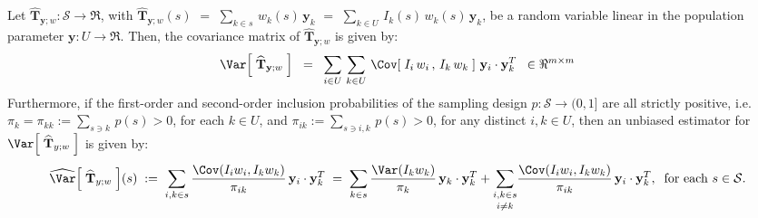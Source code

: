 \begin{proposition}
\label{proposition:generalLinear:Var}
\mbox{}
\vskip 0.2cm
\noindent
Let $\widehat{\mathbf{T}}_{\mathbf{y};w} : \mathcal{S} \longrightarrow \Re$,
with $\widehat{\mathbf{T}}_{\mathbf{y};w}(s)$
$=$ $\underset{k \in s}{\sum}\,w_{k}(s)\,\mathbf{y}_{k}$
$=$ $\underset{k \in U}{\sum}\,I_{k}(s)\,w_{k}(s)\,\mathbf{y}_{k}$,
be a random variable linear in the population parameter $\mathbf{y} : U \longrightarrow \Re$.
Then, the covariance matrix of $\widehat{\mathbf{T}}_{\mathbf{y};w}$ is given by:
\begin{equation*}
\Var\!\left[\;\widehat{\mathbf{T}}_{\mathbf{y};w}\;\right]
\;\;=\;\;\sum_{i\in U}\,\sum_{k\in U}\,\Cov\!\left[\;I_{i}\,w_{i}\,,\,I_{k}\,w_{k}\;\right]\,\mathbf{y}_{i}\cdot\mathbf{y}_{k}^{T}
\;\; \in \Re^{m \times m}
\end{equation*}
Furthermore, if the first-order and second-order inclusion probabilities of the sampling design
$p : \mathcal{S} \longrightarrow (0,1]$ are all strictly positive,
i.e. $\pi_{k} = \pi_{kk} := \underset{s \ni k}{\sum}\,p(s) > 0$, for each $k \in U$, and
$\pi_{ik} := \underset{s \ni i,k}{\sum}\,p(s) > 0$, for any distinct $i,k \in U$,
then an unbiased estimator for $\Var\!\left[\;\widehat{\mathbf{T}}_{y;w}\;\right]$ is given by:
\begin{equation*}
\widehat{\Var}\!\left[\;\widehat{\mathbf{T}}_{y;w}\;\right]\!(s)
\;:=\; \sum_{i,k \in s}\dfrac{\Cov(I_{i}w_{i},I_{k}w_{k})}{\pi_{ik}}\,\mathbf{y}_{i}\cdot\mathbf{y}_{k}^{T}
\;=\; \sum_{k \in s}\dfrac{\Var(I_{k}w_{k})}{\pi_{k}}\,\mathbf{y}_{k}\cdot\mathbf{y}_{k}^{T}
       + \underset{i \neq k}{\sum_{i,k \in s}}\dfrac{\Cov(I_{i}w_{i},I_{k}w_{k})}{\pi_{ik}}\,\mathbf{y}_{i}\cdot\mathbf{y}_{k}^{T},
\;\;\textnormal{for each $s \in \mathcal{S}$}.
\end{equation*}
\end{proposition}


